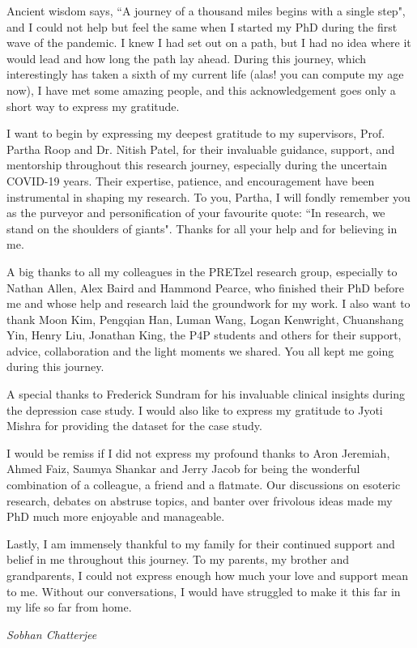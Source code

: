 \documentclass[a4paper,12pt,numbered,print,twoside]{uathesis}
\theoremstyle{remark}
\begin{document}
\begin{abstract}
\end{abstract}

\begin{acknowledgements}
  Ancient wisdom says, ``A journey of a thousand miles begins with a single step", and I could not help but feel the same when I started my PhD during the first wave of the pandemic. I knew I had set out on a path, but I had no idea where it would lead and how long the path lay ahead. During this journey, which interestingly has taken a sixth of my current life (alas! you can compute my age now), I have met some amazing people, and this acknowledgement goes only a short way to express my gratitude.

  I want to begin by expressing my deepest gratitude to my supervisors, Prof. Partha Roop and Dr. Nitish Patel, for their invaluable guidance, support, and mentorship throughout this research journey, especially during the uncertain COVID-19 years. Their expertise, patience, and encouragement have been instrumental in shaping my research. To you, Partha, I will fondly remember you as the purveyor and personification of your favourite quote: ``In research, we stand on the shoulders of giants". Thanks for all your help and for believing in me.
  
  A big thanks to all my colleagues in the PRETzel research group, especially to Nathan Allen, Alex Baird and Hammond Pearce, who finished their PhD before me and whose help and research laid the groundwork for my work. I also want to thank Moon Kim, Pengqian Han, Luman Wang, Logan Kenwright, Chuanshang Yin, Henry Liu, Jonathan King, the P4P students and others for their support, advice, collaboration and the light moments we shared. You all kept me going during this journey.
  
  A special thanks to Frederick Sundram for his invaluable clinical insights during the depression case study. I would also like to express my gratitude to Jyoti Mishra for providing the dataset for the case study.
  
  I would be remiss if I did not express my profound thanks to Aron Jeremiah, Ahmed Faiz, Saumya Shankar and Jerry Jacob for being the wonderful combination of a colleague, a friend and a flatmate. Our discussions on esoteric research, debates on abstruse topics, and banter over frivolous ideas made my PhD much more enjoyable and manageable.
  
  Lastly, I am immensely thankful to my family for their continued support and belief in me throughout this journey. To my parents, my brother and grandparents, I could not express enough how much your love and support mean to me. Without our conversations, I would have struggled to make it this far in my life so far from home.
  
  

\begin{flushright}
\textit{Sobhan Chatterjee}\\
\end{flushright}
\end{acknowledgements}
\end{document}
